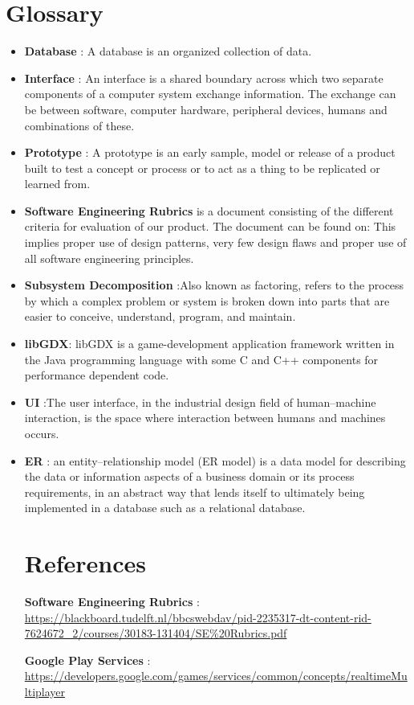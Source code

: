 \documentclass{article}
\begin{document}
	\section{Glossary}

	\begin{itemize}
		\item \textbf{Database} : A database is an organized collection of data.
		\item \textbf{Interface} : An interface is a shared boundary across which two separate components of a computer system exchange information. The exchange can be between software, computer hardware, peripheral devices, humans and combinations of these. 
		\item \textbf{Prototype} : A prototype is an early sample, model or release of a product built to test a concept or process or to act as a thing to be replicated or learned from.
		\item \textbf{Software Engineering Rubrics} is a document consisting of the different criteria for evaluation of our product. The document can be found on:  This implies proper use of design patterns, very few design flaws and proper use of all software engineering principles.
		\item \textbf{Subsystem Decomposition} :Also known as factoring, refers to the process by which a complex problem or system is broken down into parts that are easier to conceive, understand, program, and maintain.
		\item \textbf{libGDX}: libGDX is a game-development application framework written in the Java programming language with some C and C++ components for performance dependent code.
		\item \textbf{UI} :The user interface, in the industrial design field of human–machine interaction, is the space where interaction between humans and machines occurs.
		\item \textbf{ER} : an entity–relationship model (ER model) is a data model for describing the data or information aspects of a business domain or its process requirements, in an abstract way that lends itself to ultimately being implemented in a database such as a relational database.

		\section{References}
		
			\textbf{Software Engineering Rubrics} : \url{https://blackboard.tudelft.nl/bbcswebdav/pid-2235317-dt-content-rid-7624672_2/courses/30183-131404/SE\%20Rubrics.pdf}

			\textbf{Google Play Services} : \url{https://developers.google.com/games/services/common/concepts/realtimeMultiplayer}
 
		
	\end{itemize}


	
\end{document}
